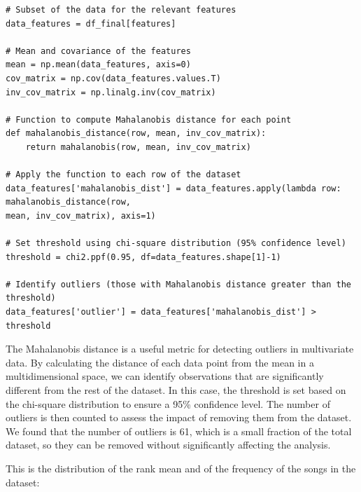 \begin{verbatim}
# Subset of the data for the relevant features
data_features = df_final[features]

# Mean and covariance of the features
mean = np.mean(data_features, axis=0)
cov_matrix = np.cov(data_features.values.T)
inv_cov_matrix = np.linalg.inv(cov_matrix)

# Function to compute Mahalanobis distance for each point
def mahalanobis_distance(row, mean, inv_cov_matrix):
    return mahalanobis(row, mean, inv_cov_matrix)

# Apply the function to each row of the dataset
data_features['mahalanobis_dist'] = data_features.apply(lambda row: mahalanobis_distance(row, 
mean, inv_cov_matrix), axis=1)

# Set threshold using chi-square distribution (95% confidence level)
threshold = chi2.ppf(0.95, df=data_features.shape[1]-1) 

# Identify outliers (those with Mahalanobis distance greater than the threshold)
data_features['outlier'] = data_features['mahalanobis_dist'] > threshold

\end{verbatim}

The Mahalanobis distance is a useful metric for detecting outliers in multivariate data. By calculating the distance of each data point from the mean in a multidimensional space, we can identify observations that are significantly different from the rest of the dataset. In this case, the threshold is set based on the chi-square distribution to ensure a 95\% confidence level. The number of outliers is then counted to assess the impact of removing them from the dataset.
We found that the number of outliers is 61, which is a small fraction of the total dataset, so they can be removed without significantly affecting the analysis.


This is the distribution of the rank mean and of the frequency of the songs in the dataset:

